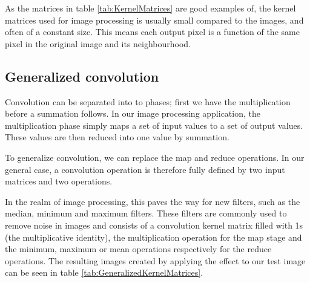 As the matrices in table \ref{tab:KernelMatrices} are good examples of, the kernel matrices used for image processing is usually small compared to the images, and often of a constant size.
This means each output pixel is a function of the same pixel in the original image and its neighbourhood.

\subsection{Generalized convolution}
Convolution can be separated into to phases; first we have the multiplication before a summation follows.
In our image processing application, the multiplication phase simply maps a set of input values to a set of output values.
These values are then reduced into one value by summation.

To generalize convolution, we can replace the map and reduce operations.
In our general case, a convolution operation is therefore fully defined by two input matrices and two operations.

In the realm of image processing, this paves the way for new filters, such as the median, minimum and maximum filters.
These filters are commonly used to remove noise in images and consists of a convolution kernel matrix filled with 1s (the multiplicative identity), the multiplication operation for the map stage and the minimum, maximum or mean operations respectively for the reduce operations.
The resulting images created by applying the effect to our test image can be seen in table \ref{tab:GeneralizedKernelMatrices}.


